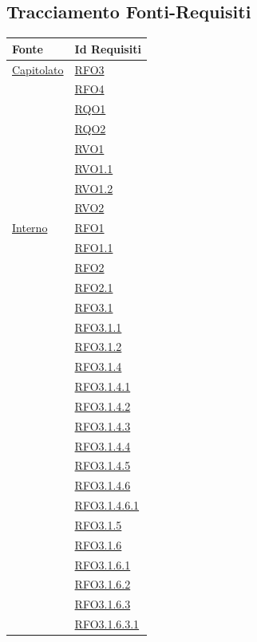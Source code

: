 \begin{itemize}
\begin{itemize}
\begin{itemize}
\begin{itemize}
\subsection{Tracciamento Fonti-Requisiti}
\normalsize
\begin{longtable}{|>{\centering}m{5cm}|m{5cm}<{\centering}|}
\hline
\textbf{Fonte} & \textbf{Id Requisiti}\\
\hline
\endhead
\hyperlink{Capitolato}{Capitolato} & \hyperlink{RFO3}{RFO3}\\
& \hyperlink{RFO4}{RFO4}\\
& \hyperlink{RQO1}{RQO1}\\
& \hyperlink{RQO2}{RQO2}\\
& \hyperlink{RVO1}{RVO1}\\
& \hyperlink{RVO1.1}{RVO1.1}\\
& \hyperlink{RVO1.2}{RVO1.2}\\
& \hyperlink{RVO2}{RVO2}\\ \hline
\hyperlink{Interno}{Interno} & \hyperlink{RFO1}{RFO1}\\
& \hyperlink{RFO1.1}{RFO1.1}\\
& \hyperlink{RFO2}{RFO2}\\
& \hyperlink{RFO2.1}{RFO2.1}\\
& \hyperlink{RFO3.1}{RFO3.1}\\
& \hyperlink{RFO3.1.1}{RFO3.1.1}\\
& \hyperlink{RFO3.1.2}{RFO3.1.2}\\
& \hyperlink{RFO3.1.4}{RFO3.1.4}\\
& \hyperlink{RFO3.1.4.1}{RFO3.1.4.1}\\
& \hyperlink{RFO3.1.4.2}{RFO3.1.4.2}\\
& \hyperlink{RFO3.1.4.3}{RFO3.1.4.3}\\
& \hyperlink{RFO3.1.4.4}{RFO3.1.4.4}\\
& \hyperlink{RFO3.1.4.5}{RFO3.1.4.5}\\
& \hyperlink{RFO3.1.4.6}{RFO3.1.4.6}\\
& \hyperlink{RFO3.1.4.6.1}{RFO3.1.4.6.1}\\
& \hyperlink{RFO3.1.5}{RFO3.1.5}\\
& \hyperlink{RFO3.1.6}{RFO3.1.6}\\
& \hyperlink{RFO3.1.6.1}{RFO3.1.6.1}\\
& \hyperlink{RFO3.1.6.2}{RFO3.1.6.2}\\
& \hyperlink{RFO3.1.6.3}{RFO3.1.6.3}\\
& \hyperlink{RFO3.1.6.3.1}{RFO3.1.6.3.1}\\

\end{longtable}
\end{itemize}
\end{itemize}
\end{itemize}
\end{itemize}
